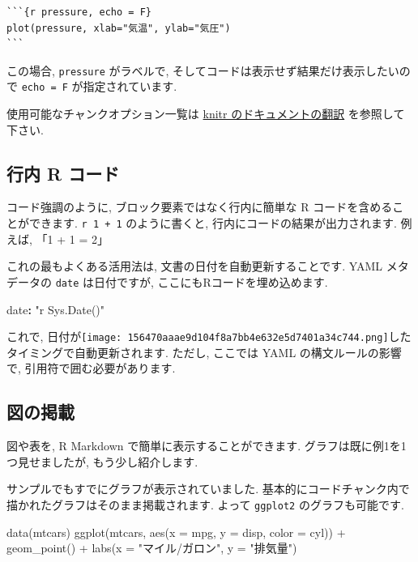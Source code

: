 \documentclass[
]{ltjsarticle}
\newenvironment{Shaded}{\begin{snugshade}}{\end{snugshade}}
\newcommand{\AttributeTok}[1]{\textcolor[rgb]{0.77,0.63,0.00}{#1}}
\newcommand{\FunctionTok}[1]{\textcolor[rgb]{0.00,0.00,0.00}{#1}}
\newcommand{\KeywordTok}[1]{\textcolor[rgb]{0.13,0.29,0.53}{\textbf{#1}}}
\newcommand{\NormalTok}[1]{#1}
\newcommand{\SpecialCharTok}[1]{\textcolor[rgb]{0.00,0.00,0.00}{#1}}
\newcommand{\StringTok}[1]{\textcolor[rgb]{0.31,0.60,0.02}{#1}}
\begin{document}
\begin{verbatim}
```{r pressure, echo = F}
plot(pressure, xlab="気温", ylab="気圧")
```
\end{verbatim}

この場合, \texttt{pressure} がラベルで, そしてコードは表示せず結果だけ表示したいので \texttt{echo\ =\ F} が指定されています.

使用可能なチャンクオプション一覧は \href{https://gedevan-aleksizde.github.io/knitr-doc-ja/index.html}{knitr のドキュメントの翻訳} を参照して下さい.

\hypertarget{ux884cux5185-r-ux30b3ux30fcux30c9}{%
\subsection{行内 R コード}\label{ux884cux5185-r-ux30b3ux30fcux30c9}}

コード強調のように, ブロック要素ではなく行内に簡単な R コードを含めることができます. \texttt{\textasciigrave{}r\ 1\ +\ 1\textasciigrave{}} のように書くと, 行内にコードの結果が出力されます. 例えば, 「1 + 1 = 2」

これの最もよくある活用法は, 文書の日付を自動更新することです. YAML メタデータの \texttt{date} は日付ですが, ここにもRコードを埋め込めます.

\begin{Shaded}
\begin{Highlighting}[]
\FunctionTok{date}\KeywordTok{:}\AttributeTok{ }\StringTok{"\textasciigrave{}r Sys.Date()\textasciigrave{}"}
\end{Highlighting}
\end{Shaded}

これで, 日付が\texttt{[image: 156470aaae9d104f8a7bb4e632e5d7401a34c744.png]}したタイミングで自動更新されます. ただし, ここでは YAML の構文ルールの影響で, 引用符で囲む必要があります.

\hypertarget{figure-tables}{%
\subsection{図の掲載}\label{figure-tables}}

図や表を, R Markdown で簡単に表示することができます. グラフは既に例1を1つ見せましたが, もう少し紹介します.

サンプルでもすでにグラフが表示されていました. 基本的にコードチャンク内で描かれたグラフはそのまま掲載されます. よって \texttt{ggplot2} のグラフも可能です.

\begin{Shaded}
\begin{Highlighting}[numbers=left,,]
\FunctionTok{data}\NormalTok{(mtcars)}
\FunctionTok{ggplot}\NormalTok{(mtcars, }\FunctionTok{aes}\NormalTok{(}\AttributeTok{x =}\NormalTok{ mpg, }\AttributeTok{y =}\NormalTok{ disp, }\AttributeTok{color =}\NormalTok{ cyl)) }\SpecialCharTok{+}
  \FunctionTok{geom\_point}\NormalTok{() }\SpecialCharTok{+}
  \FunctionTok{labs}\NormalTok{(}\AttributeTok{x =} \StringTok{"マイル/ガロン"}\NormalTok{, }\AttributeTok{y =} \StringTok{"排気量"}\NormalTok{)}
\end{Highlighting}
\end{Shaded}
\end{document}
